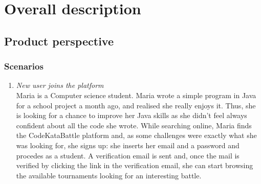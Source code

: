 \documentclass[12pt, a4paper]{report}
\begin{document}
\chapter{Overall description}
    \section{Product perspective}
    \subsection{Scenarios}
    \begin{enumerate}
        \item \textit{New user joins the platform}\\
            Maria is a Computer science student. Maria wrote a simple program in Java for a school project a month ago, and realised she really enjoys it. 
            Thus, she is looking for a chance to improve her Java skills as she didn't feel always confident about all the code she wrote.
            While searching online, Maria finds the CodeKataBattle platform and, as some challenges were exactly what she was looking for, she signs up: she inserts her email and a password and procedes as a student.
            A verification email is sent and, once the mail is verified by clicking the link in the verification email, she can start browsing the available tournaments looking for an interesting battle.
        

\end{enumerate}
\end{document}
